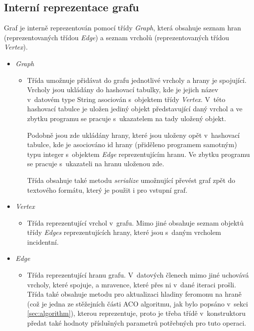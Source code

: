 \documentclass[a4paper, 12pt]{article}
\begin{document}
\subsection{Interní reprezentace grafu}
\label{subsec:graph}
Graf je interně reprezentován pomocí třídy \emph{Graph}, která obsahuje seznam hran (reprezentovaných třídou \emph{Edge}) a seznam vrcholů (reprezentovaných
třídou \emph{Vertex}).
\begin{itemize}
  \item \emph{Graph}
  \begin{itemize}
    \item[] Třída umožnuje přidávat do grafu jednotlivé vrcholy a hrany je spojující. Vrcholy jsou ukládány do hashovací tabulky, kde je jejich název v~datovém
    type String asociován s~objektem třídy \emph{Vertex}. V~této hashovací tabulce je uložen jediný objekt představující daný vrchol a
    ve zbytku programu se pracuje s~ukazatelem na tady uložený objekt.
    
    Podobně jsou zde ukládány hrany, které jsou uloženy opět v~hashovací tabulce, kde je asociováno id hrany (přiděleno programem samotným) typu integer
    s~objektem \emph{Edge} reprezentujícím hranu. Ve zbytku programu se pracuje s~ukazateli na hranu uloženou zde.

    Třída obsahuje také metodu \emph{serialize} umožnující převést graf zpět do textového formátu, který je použit i pro vstupní graf.
  \end{itemize}

  \item \emph{Vertex}
  \begin{itemize}
    \item[] Třída reprezentující vrchol v~grafu. Mimo jiné obsahuje seznam objektů třídy \emph{Edges} reprezentujících hrany, které jsou s~daným vrcholem
    incidentní.
  \end{itemize}

  \item \emph{Edge}
  \begin{itemize}
    \item[] Třída reprezentující hranu grafu. V~datových členech mimo jiné uchovává vrcholy, které spojuje, a mravence, které přes ni v~dané iteraci prošli. 
    Třída také obsahuje metodu pro aktualizaci hladiny feromonu na hraně (což je jedna ze stěžejních části ACO algoritmu, jak bylo popsáno v~sekci 
    \ref{sec:algorithm}), kterou reprezentuje, proto je třeba třídě v~konstruktoru předat také hodnoty příslušných parametrů potřebných pro tuto operaci.
  \end{itemize}
\end{itemize}
\end{document}
